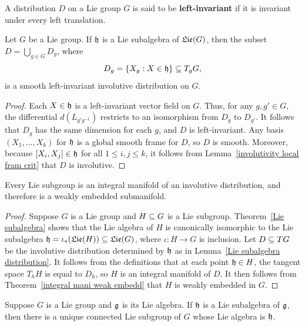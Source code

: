 A distribution $D$ on a Lie group $G$ is said to be \textbf{left-invariant} if it is invariant under every left translation.
\begin{lemma}\label{Lie subalgebra distribution}
Let $G$ be a Lie group. If $\mathfrak{h}$ is a Lie subalgebra of $\mathfrak{Lie}(G)$, then the subset $D=\bigcup_{g\in G}D_g$, where
\[D_g=\{X_g:X\in\mathfrak{h}\}\subseteq T_gG,\]
is a smooth left-invariant involutive distribution on $G$.
\end{lemma}
\begin{proof}
Each $X\in\mathfrak{h}$ is a left-invariant vector field on $G$. Thus, for any $g,g'\in G$, the differential $d(L_{g'g^{-1}})$ restricts to an isomorphism from $D_g$ to $D_{g'}$. It follows that $D_g$ has the same dimension for each $g$, and $D$ is left-invariant. Any basis $(X_1,\dots,X_k)$ for $\mathfrak{h}$ is a global smooth frame for $D$, so $D$ is smooth. Moreover, because $[X_i,X_j]\in\mathfrak{h}$ for all $1\leq i,j\leq k$, it follows from Lemma~\ref{involutivity local fram crit} that $D$ is involutive.
\end{proof}
\begin{theorem}\label{Lie subgroup weak embedd}
Every Lie subgroup is an integral manifold of an involutive distribution, and therefore is a weakly embedded submanifold.
\end{theorem}
\begin{proof}
Suppose $G$ is a Lie group and $H\subseteq G$ is a Lie subgroup. Theorem~\ref{Lie subalgebra} shows that the Lie algebra of $H$ is canonically isomorphic to the Lie subalgebra $\mathfrak{h}=\iota_*(\mathfrak{Lie}(H))\subseteq\mathfrak{Lie}(G)$, where $\iota:H\to G$ is inclusion. Let $D\subseteq TG$ be the involutive distribution determined by $\mathfrak{h}$ as in Lemma~\ref{Lie subalgebra distribution}. It follows from the definitions that at each point $\mathfrak{h}\in H$, the tangent space $T_hH$ is equal to $D_h$, so $H$ is an integral manifold of $D$. It then follows from Theorem~\ref{integral mani weak embedd} that $H$ is weakly embedded in $G$.
\end{proof}
\begin{theorem}\label{Lie subgroup generated by Lie subalgebra}
Suppose $G$ is a Lie group and $\mathfrak{g}$ is its Lie algebra. If $\mathfrak{h}$ is a Lie subalgebra of $\mathfrak{g}$, then there is a unique connected Lie subgroup of $G$ whose Lie algebra is $\mathfrak{h}$.
\end{theorem}
